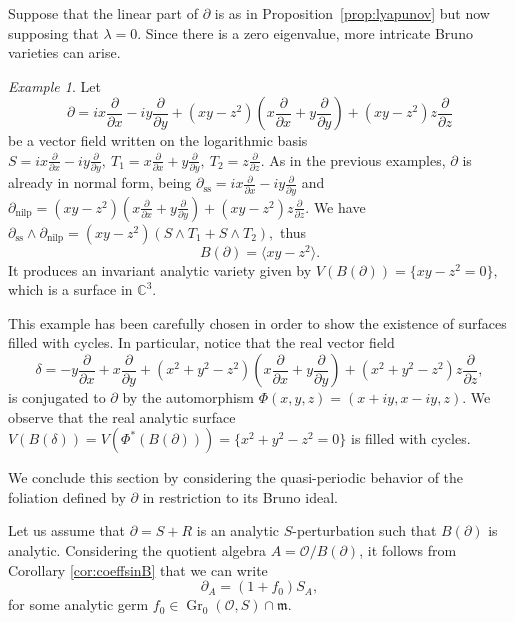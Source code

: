 \documentclass[10pt,twoside,reqno]{amsart}
\theoremstyle{remark}
\theoremstyle{remark}
\newtheorem{example}[thm]{Example}
\newcommand{\C}{\mathbb{C}}
\newcommand{\OO}{\mathcal{O}}
\newcommand{\xx}{\frac{\partial}{\partial x}}
\newcommand{\yy}{\frac{\partial}{\partial y}}
\newcommand{\zz}{\frac{\partial}{\partial z}}
\newcommand{\tmop}[1]{{\operatorname{#1}}}
\newcommand{\Gr}{\operatorname{Gr}}
\begin{document}
Suppose that the linear part of $\partial$ is as in Proposition~\ref{prop:lyapunov} but now supposing that $\lambda=0$. Since there is a zero eigenvalue, more intricate Bruno varieties can arise.

\begin{example}
    Let $$\partial = ix\xx - iy\yy + (xy-z^2)(x\xx + y\yy) + (xy-z^2) z\zz $$
    be a vector field written on the logarithmic basis $S= ix\xx - iy\yy, \ T_1=x\xx + y\yy, \ T_2= z\zz$. As in the previous examples, $\partial$ is already in normal form, being $\partial_{\tmop{ss}}= ix\xx - iy\yy$ and $\partial_{\tmop{nilp}}= (xy-z^2)(x\xx + y\yy) + (xy-z^2) z\zz. $
    We have $\partial_{\tmop{ss}}\wedge \partial_{\tmop{nilp}}= (xy - z^2) (S\wedge T_1 + S\wedge T_2), $ thus
    $$  B(\partial) = \big \langle xy - z^2\big \rangle.  $$
    It produces an invariant analytic variety given by $V(B(\partial))=\{ xy - z^2= 0\}, $ which is a surface in $\C^3$. 

    This example has been carefully chosen in order to show the existence of surfaces filled with cycles. In particular, notice that the real vector field $$ \delta= -y\xx + x\yy  +  (x^2+ y^2-z^2)(x\xx + y\yy) + (x^2+ y^2-z^2) z\zz ,$$ 
    is conjugated to $\partial$ by the automorphism $\Phi(x,y,z)=(x+iy, x-iy,z)$. We observe that the real analytic surface $V(B(\delta))= V(\Phi^* (B(\partial)))= \{ x^2+ y^2-z^2=0\}  $ is filled with cycles.
\end{example}


We conclude this section by considering the quasi-periodic behavior of the foliation defined by $\partial$ in restriction to its Bruno ideal.

Let us assume that $\partial = S+R$ is an analytic $S$-perturbation such that $B(\partial)$ is analytic. Considering the quotient algebra $A = \OO / B(\partial)$, it follows from Corollary \ref{cor:coeffsinB} that we can write
$$\partial_A = (1+f_0) S_A,$$ 
for some analytic germ $f_0 \in \Gr_0(\OO,S) \cap \mathfrak{m}$. 
\end{document}
